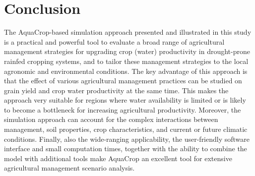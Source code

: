 \section{Conclusion}
The AquaCrop-based simulation approach presented and illustrated in this study is a practical and powerful tool to evaluate a broad range of agricultural management strategies for upgrading crop (water) productivity in drought-prone rainfed cropping systems, and to tailor these management strategies to the local agronomic and environmental conditions. The key advantage of this approach is that the effect of various agricultural management practices can be studied on grain yield and crop water productivity at the same time. This makes the approach very suitable for regions where water availability is limited or is likely to become a bottleneck for increasing agricultural productivity. Moreover, the simulation approach can account for the complex interactions between management, soil properties, crop characteristics, and current or future climatic conditions. Finally, also the wide-ranging applicability, the user-friendly software interface and small computation times, together with the ability to combine the model with additional tools make AquaCrop an excellent tool for extensive agricultural management scenario analysis.

\cleardoublepage